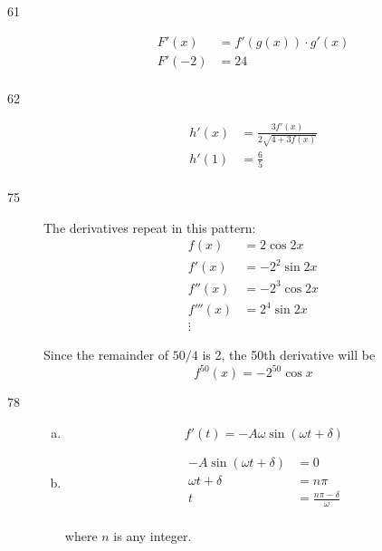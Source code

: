 \documentclass[letterpaper, landscape]{exam}
\begin{document}
\begin{description}
    \item[61] 
      \begin{align*}
        F'(x)  & = f'(g(x)) \cdot g'(x) \\
        F'(-2) & = \boxed{ 24 } \\
      \end{align*}

    \item[62] 
      \begin{align*}
        h'(x) &= \frac{3 f'(x)}{2 \sqrt{4 + 3 f(x)}} \\
        h'(1) &= \boxed{ \frac{6}{5} } \\
      \end{align*}

    \item[75]
      The derivatives repeat in this pattern:
      \begin{align*}
        f(x)     & = 2 \cos 2x \\
        f'(x)    & = - 2^2 \sin 2x \\
        f''(x)   & = - 2^3 \cos 2x \\
        f'''(x)  & = 2^4 \sin 2x \\
        \vdots
      \end{align*}

      Since the remainder of $50/4$ is 2, the 50th derivative will be 
      \[
        \boxed{ f^{50}(x) = - 2^{50} \cos x }
      \]

    \item[78] 
      \begin{enumerate}[(a)]
        \item 
          \[
            f'(t) = \boxed{ -A \omega \sin(\omega t + \delta) }
          \]

        \item 
          \begin{align*}
            -A \sin(\omega t + \delta) & = 0 \\
            \omega t + \delta          & = n \pi \\
            t                          & = \boxed{ \frac{n \pi - \delta}{\omega} } \\
          \end{align*}

          where $n$ is any integer.

      \end{enumerate}


\end{description}
\end{document}
